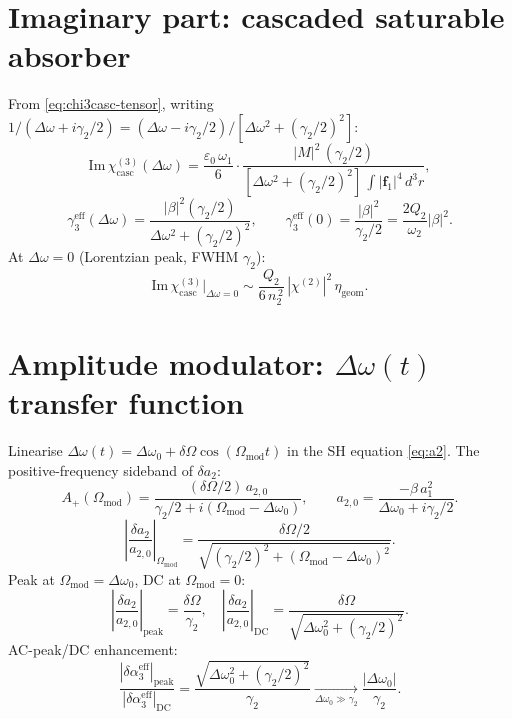 \documentclass[11pt,a4paper]{article}
\newcommand{\eps}{\varepsilon}
\newcommand{\bvec}[1]{\mathbf{#1}}
\newcommand{\f}{\bvec{f}}
\newcommand{\dthreer}{\,d^{3}r}
\newcommand{\chitwo}{\chi^{(2)}}
\newcommand{\chithree}{\chi^{(3)}}
\newcommand{\Dom}{\Delta\omega}
\begin{document}
\section{Imaginary part: cascaded saturable absorber}

From \eqref{eq:chi3casc-tensor}, writing $1/(\Dom+i\gamma_2/2)=(\Dom-i\gamma_2/2)/[\Dom^2+(\gamma_2/2)^2]$:
\begin{equation}
  \mathrm{Im}\,\chithree_\text{casc}(\Dom)
   =\frac{\eps_0\,\omega_1}{6}\cdot
        \frac{|M|^{2}\,(\gamma_2/2)}{[\Dom^{2}+(\gamma_2/2)^{2}]\,\int|\f_1|^{4}\dthreer},
\end{equation}
\begin{equation}
  \gamma_3^\text{eff}(\Dom)=\frac{|\beta|^{2}(\gamma_2/2)}{\Dom^{2}+(\gamma_2/2)^{2}},
  \qquad
  \gamma_3^\text{eff}(0)=\frac{|\beta|^{2}}{\gamma_2/2}=\frac{2 Q_2}{\omega_2}|\beta|^{2}.
\end{equation}
At $\Dom=0$ (Lorentzian peak, FWHM $\gamma_2$):
\begin{equation}
  \mathrm{Im}\,\chithree_\text{casc}\big|_{\Dom=0}
       \sim\frac{Q_2}{6\,n_2^{\,2}}\,|\chitwo|^{2}\,\eta_\text{geom}.
\end{equation}

\section{Amplitude modulator: $\Dom(t)$ transfer function}

Linearise $\Dom(t)=\Dom_0+\delta\Omega\cos(\Omega_\text{mod}t)$ in the SH equation \eqref{eq:a2}. The positive-frequency sideband of $\delta a_2$:
\begin{equation}
  A_+(\Omega_\text{mod})=\frac{(\delta\Omega/2)\,a_{2,0}}{\gamma_2/2+i(\Omega_\text{mod}-\Dom_0)},
  \qquad a_{2,0}=\frac{-\beta\,a_1^{2}}{\Dom_0+i\gamma_2/2}.
\end{equation}
\begin{equation}
  \left|\frac{\delta a_2}{a_{2,0}}\right|_{\Omega_\text{mod}}
   =\frac{\delta\Omega/2}{\sqrt{(\gamma_2/2)^{2}+(\Omega_\text{mod}-\Dom_0)^{2}}}.
\end{equation}
Peak at $\Omega_\text{mod}=\Dom_0$, DC at $\Omega_\text{mod}=0$:
\begin{equation}
  \left|\frac{\delta a_2}{a_{2,0}}\right|_\text{peak}=\frac{\delta\Omega}{\gamma_2},
  \quad
  \left|\frac{\delta a_2}{a_{2,0}}\right|_\text{DC}=\frac{\delta\Omega}{\sqrt{\Dom_0^{2}+(\gamma_2/2)^{2}}}.
\end{equation}
AC-peak/DC enhancement:
\begin{equation}
  \boxed{\;
  \frac{|\delta\alpha_3^\text{eff}|_\text{peak}}{|\delta\alpha_3^\text{eff}|_\text{DC}}
  =\frac{\sqrt{\Dom_0^{2}+(\gamma_2/2)^{2}}}{\gamma_2}
  \xrightarrow[\Dom_0\gg\gamma_2]{}\frac{|\Dom_0|}{\gamma_2}.\;}
  \label{eq:AC-peak-enhancement}
\end{equation}
\end{document}
